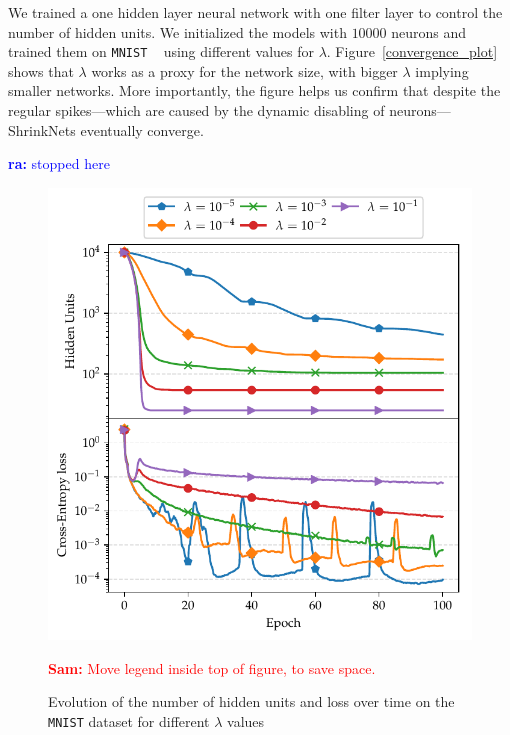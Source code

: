 \documentclass[sigconf]{acmart}
\newcommand{\srm}[1]{\textcolor{red}{{\bf Sam:} #1}}
\newcommand{\ra}[1]{\textcolor{blue}{{\bf ra:} #1}}
\newcommand{\gl}[1]{\textcolor{violet}{{\bf Gl:} #1}}
\begin{document}
We trained a one hidden layer
neural network with one filter layer to control the number of hidden units. We
initialized the models with $10000$ neurons and trained them on \texttt{MNIST}
~\cite{Lecun1998} using different values for $\lambda$.
Figure~\autoref{convergence_plot} shows that
$\lambda$ works as a proxy for the network size,
with bigger $\lambda$ implying smaller
networks. More importantly, the figure helps us confirm that despite the regular
spikes---which are caused by the dynamic disabling of neurons---ShrinkNets
eventually converge.

\ra{stopped here}

\begin{figure}
\vspace{-.2in}
\begin{center}
\includegraphics[width=0.9\columnwidth]{convergence}
\vspace{-.2in}
\caption{Evolution of the number of hidden units and loss over time on the \texttt{MNIST} dataset for different $\lambda$ values \label{convergence_plot}}
\srm{Move legend inside top of figure, to save space.}
\vspace{-.2in}
\end{center}
\end{figure}
\end{document}
